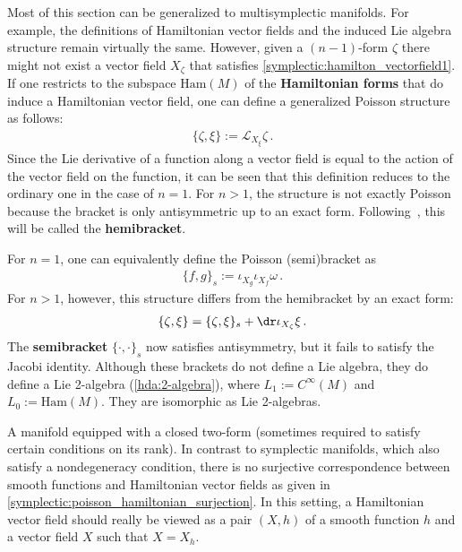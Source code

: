     \begin{remark}\label{symplectic:hamiltonian_forms}
        Most of this section can be generalized to multisymplectic manifolds. For example, the definitions of Hamiltonian vector fields and the induced Lie algebra structure remain virtually the same. However, given a $(n-1)$-form $\zeta$ there might not exist a vector field $X_\zeta$ that satisfies \cref{symplectic:hamilton_vectorfield1}. If one restricts to the subspace $\mathrm{Ham}(M)$ of the \textbf{Hamiltonian forms} that do induce a Hamiltonian vector field, one can define a generalized Poisson structure as follows:
        \begin{gather}
            \{\zeta,\xi\} := \mathcal{L}_{X_\xi}\zeta\,.
        \end{gather}
        Since the Lie derivative of a function along a vector field is equal to the action of the vector field on the function, it can be seen that this definition reduces to the ordinary one in the case of $n=1$. For $n>1$, the structure is not exactly Poisson because the bracket is only antisymmetric up to an exact form. Following~\citet{baez_categorified_2010}, this will be called the \textbf{hemibracket}.

        For $n=1$, one can equivalently define the Poisson (semi)bracket as
        \begin{gather}
            \{f,g\}_s := \iota_{X_g}\iota_{X_f}\omega\,.
        \end{gather}
        For $n>1$, however, this structure differs from the hemibracket by an exact form:
        \begin{gather}
            \{\zeta,\xi\} = \{\zeta,\xi\}_s + \dr\iota_{X_\zeta}\xi\,.
        \end{gather}
        The \textbf{semibracket} $\{\cdot,\cdot\}_s$ now satisfies antisymmetry, but it fails to satisfy the Jacobi identity. Although these brackets do not define a Lie algebra, they do define a Lie 2-algebra (\cref{hda:2-algebra}), where $L_1:=C^\infty(M)$ and $L_0:=\mathrm{Ham}(M)$. They are isomorphic as Lie 2-algebras.
    \end{remark}

    \begin{remark}
        A manifold equipped with a closed two-form (sometimes required to satisfy certain conditions on its rank). In contrast to symplectic manifolds, which also satisfy a nondegeneracy condition, there is no surjective correspondence between smooth functions and Hamiltonian vector fields as given in \cref{symplectic:poisson_hamiltonian_surjection}. In this setting, a Hamiltonian vector field should really be viewed as a pair $(X,h)$ of a smooth function $h$ and a vector field $X$ such that $X=X_h$.
    \end{remark}

